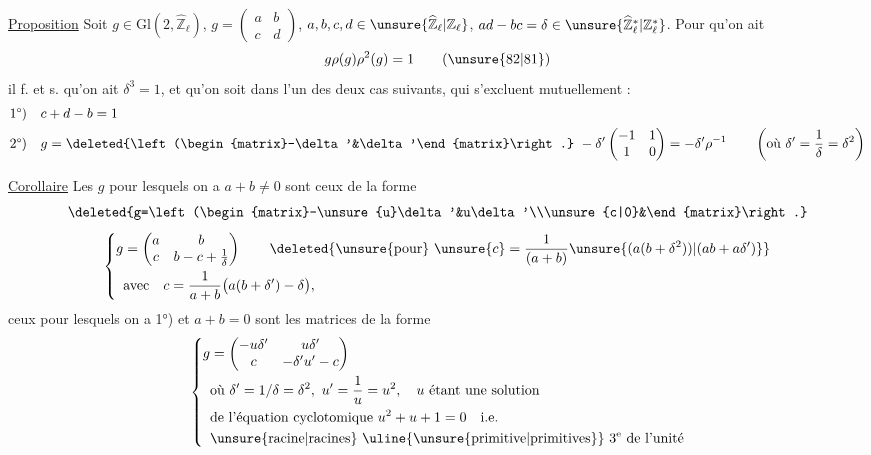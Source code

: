 
\uline{Proposition} Soit $g\in\mathrm{Gl}(2,\widehat{\mathbb Z}_\ell)$, $g=\begin{pmatrix}a&b\\c&d\end{pmatrix}$, $a,b,c,d\in\unsure{\widehat{\mathbb Z}_\ell|\mathbb Z_\ell}$,
$ad-bc=\delta\in\unsure{\widehat{\mathbb Z}_\ell^{*}|\mathbb Z_\ell^{*}}$. Pour qu'on ait
\[
g\rho(g)\rho^2(g)=1\qquad(\unsure{82|81})
\]
il f. et s. qu'on ait $\delta^3=1$, et qu'on soit dans l'un des deux cas suivants, qui s'excluent mutuellement :
\[
\begin{aligned}
1\text{°)}\quad&c+d-b=1\\
2\text{°)}\quad&g=\deleted{\left(\begin{matrix}-\delta'&\delta'\end{matrix}\right.}\ -\delta'\begin{pmatrix}-1&1\\1&0\end{pmatrix}=-\delta'\rho^{-1}\qquad\left(\text{où }\delta'=\frac1\delta=\delta^2\right)
\end{aligned}
\]


\uline{Corollaire} Les $g$ pour lesquels on a   $a+b\ne0$ sont ceux de la forme
\[
\deleted{g=\left(\begin{matrix}-\unsure{u}\delta'&u\delta'\\\unsure{c|0}&\end{matrix}\right.}
\]
\[
\left\{\begin{aligned}
g&=\begin{pmatrix}a&b\\c&b-c+\frac1\delta\end{pmatrix}\qquad\deleted{\unsure{\text{pour}}\ \unsure{c}=\frac1{(a+b)}\unsure{(a(b+\delta^2))|(ab+a\delta')}}\\
&\text{avec}\quad c=\frac1{a+b}\bigl(a(b+\delta')-\delta\bigr),
\end{aligned}\right.
\]
ceux pour lesquels on a 1°) et $a+b=0$ sont  les matrices de la forme
\[
\left\{\begin{aligned}
g&=\begin{pmatrix}-u\delta'&u\delta'\\c&-\delta'u'-c\end{pmatrix}\\
&\text{où }\delta'=1/\delta=\delta^2,\ u'=\frac1u=u^2,\quad u\text{ étant une solution}\\
&\text{de l'équation cyclotomique }u^2+u+1=0\quad\text{i.e.}\\
&\text{\unsure{racine|racines} \uline{\unsure{primitive|primitives}} }3^{\mathrm e}\text{ de l'unité}
\end{aligned}\right.
\]
